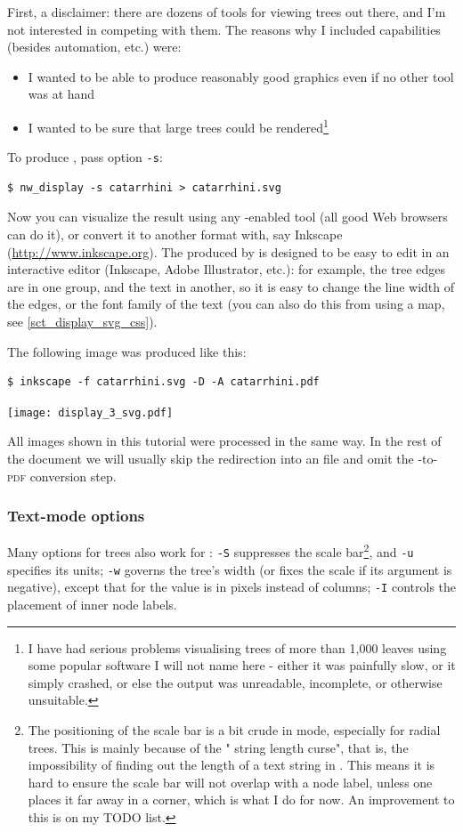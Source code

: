 First, a disclaimer: there are dozens of tools for viewing trees out there, and
I'm not interested in competing with them. The reasons why I included \svg{}
capabilities (besides automation, etc.) were:
\begin{itemize}
\item I wanted to be able to produce reasonably good graphics even if no other
tool was at hand
\item I wanted to be sure that large trees could be rendered\footnote{I have
had serious problems visualising trees of more than 1,000 leaves using some
popular software I will not name here - either it was painfully slow, or it
simply crashed, or else the output was unreadable, incomplete, or otherwise
unsuitable.}
\end{itemize}
To produce \svg, pass option \texttt{-s}:
\begin{verbatim}
$ nw_display -s catarrhini > catarrhini.svg
\end{verbatim}
Now you can visualize the result using any \svg-enabled tool (all good Web
browsers can do it), or convert it to another format with, say Inkscape
(\url{http://www.inkscape.org}).  The \svg{} produced by \display{} is designed
to be easy to edit in an interactive editor (Inkscape, Adobe Illustrator,
etc.): for example, the tree edges are in one group, and the text in another,
so it is easy to change the line width of the edges, or the font family of the
text (you can also do this from \display{} using a \css{} map, see
\ref{sct_display_svg_css}).

The following \pdf{} image was produced like this:

\begin{verbatim}
$ inkscape -f catarrhini.svg -D -A catarrhini.pdf
\end{verbatim}

\begin{center}
 \texttt{[image: display\_3\_svg.pdf]}
\end{center}
All \svg{} images shown in this tutorial were processed in the same way. In the
rest of the document we will usually skip the redirection into an \svg{} file
and omit the \svg{}-to-\textsc{pdf} conversion step.

\subsubsection{Text-mode options}

Many options for \ascii{} trees also work for \svg{}: \texttt{-S} suppresses the
scale bar\footnote{The positioning of the scale bar is a bit crude in \svg{}
mode, especially for radial trees. This is mainly because of the "\svg{} string
length curse", that is, the impossibility of finding out the length of a text
string in \svg.  This means it is hard to ensure the scale bar will not overlap
with a node label, unless one places it far away in a corner, which is what I do
for now. An improvement to this is on my TODO list.}, and \texttt{-u} specifies
its units; \texttt{-w} governs the tree's width (or fixes the scale if its
argument is negative), except that for \svg{} the value is in pixels instead of
columns; \texttt{-I} controls the placement of inner node labels. 

